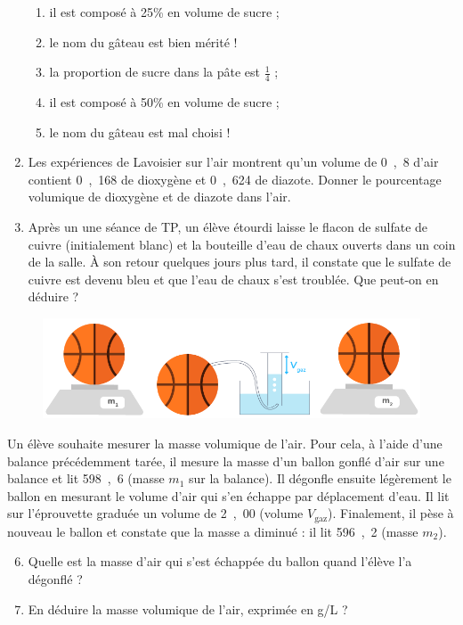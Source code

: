 \begin{enumerate}
\begin{multicols}{2}
\begin{enumerate}
\item il est composé à \unit{25}{\%} en volume de sucre ;

\item le nom du gâteau est bien mérité !

\item la proportion de sucre dans la pâte est $\frac{1}{4}$ ;

\item il est composé à \unit{50}{\%} en volume de sucre ;

\item le nom du gâteau est mal choisi !
\end{enumerate}
\end{multicols}

\item Les expériences de Lavoisier sur l'air montrent qu'un volume de \unit{0{,}8}{\liter} d'air contient \unit{0{,}168}{\liter} de dioxygène et \unit{0{,}624}{\liter} de diazote.
Donner le pourcentage volumique de dioxygène et de diazote dans l'air.

\item Après un une séance de TP, un élève étourdi laisse le flacon de sulfate de cuivre (initialement blanc) et la bouteille d'eau de chaux ouverts dans un coin de la salle.
À son retour quelques jours plus tard, il constate que le sulfate de cuivre est devenu bleu et que l'eau de chaux s'est troublée.
Que peut-on en déduire ?
\end{enumerate}

\begin{figure}[h]
\center
\includegraphics[scale=0.5]{images/masse_volumique_air.png}
\end{figure}

Un élève souhaite mesurer la masse volumique de l'air.
Pour cela, à l'aide d'une balance précédemment tarée, il mesure la masse d'un ballon gonflé d'air sur une balance et lit \unit{598{,}6}{\gram} (masse $m_1$ sur la balance).
Il dégonfle ensuite légèrement le ballon en mesurant le volume d'air qui s'en échappe par déplacement d'eau.
Il lit sur l'éprouvette graduée un volume de \unit{2{,}00}{\liter} (volume $V_\mathrm{gaz}$).
Finalement, il pèse à nouveau le ballon et constate que la masse a diminué : il lit \unit{596{,}2}{\gram} (masse $m_2$).

\begin{enumerate}
\setcounter{enumi}{5}
\item Quelle est la masse d'air qui s'est échappée du ballon quand l'élève l'a dégonflé ?
\item En déduire la masse volumique de l'air, exprimée en g/L ?
\end{enumerate}



